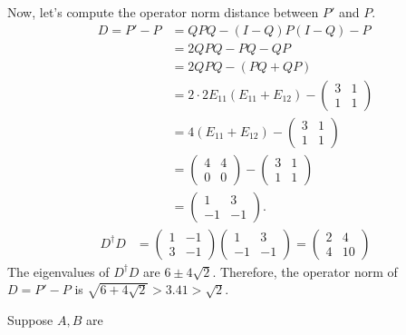 \begin{example}
\noindent Now, let's compute the operator norm distance between $P'$ and $P$.
\begin{align*}
    D = P' - P &=  QPQ - (I-Q)P(I-Q) - P \\
    &= 2QPQ - PQ - QP \\
    &= 2QPQ - (PQ + QP)\\
    &= 2\cdot 2E_{11} \left(E_{11} + E_{12}\right) - \begin{pmatrix}
        3 & 1\\1&1
    \end{pmatrix}\\
    &= 4\left(E_{11} + E_{12} \right) - \begin{pmatrix}
        3 & 1\\1&1
    \end{pmatrix} \\
    &= \begin{pmatrix}
        4 & 4\\0 & 0
    \end{pmatrix} - \begin{pmatrix}
        3 & 1\\ 1 & 1
    \end{pmatrix} \\
    &= \begin{pmatrix}
        1 & 3\\ -1 & -1
    \end{pmatrix} .
\end{align*}
\begin{align*}
    D^\dagger D &= \begin{pmatrix}
        1 & -1 \\ 3 & -1
    \end{pmatrix} \begin{pmatrix}
        1 & 3\\-1 & -1
    \end{pmatrix} = \begin{pmatrix}2 & 4\\4&10
    \end{pmatrix}
\end{align*}
The eigenvalues of $D^\dagger D$ are $6 \pm 4\sqrt{2}$. Therefore, the operator norm of $D = P' - P$ is $\sqrt{6 + 4\sqrt{2}} > 3.41 > \sqrt{2}$.
\end{example}

\begin{lemma}
    Suppose $A, B$ are 
\end{lemma}



